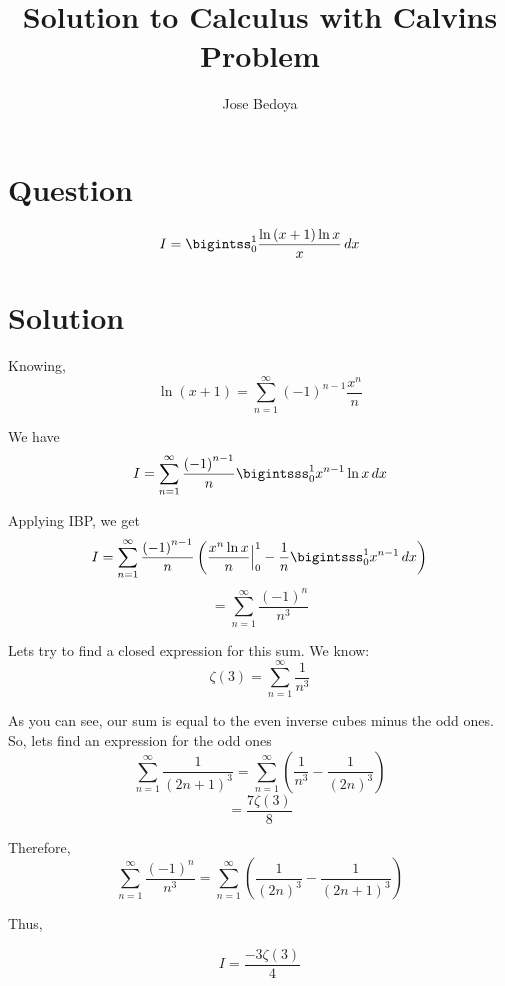\documentclass{article}
\begin{document}
\pagecolor{Red}
\title{Solution to Calculus with Calvin\textsc{}s Problem}
\author{Jose Bedoya}
\maketitle
\section{Question}
{\LARGE
$$I=\bigintss_{0}^{1} \frac{\ln \left(x+1\right)\ln x}{x}\,dx$$
}
\section{Solution}
{\Large
Knowing,
$$\ln \left(x+1\right)=\sum_{n=1}^{\infty} \left(-1\right)^{n-1}\frac{x^n}{n}$$

\vspace{3mm}
We have
$$I=\sum_{n=1}^{\infty}\frac{\left(-1\right)^{n-1}}{n}\bigintsss_{0}^{1}x^{n-1}\ln x\,dx$$

\vspace{3mm}
Applying IBP, we get
$$I=\sum_{n=1}^{\infty}\frac{\left(-1\right)^{n-1}}{n}\left(\frac{x^n\ln x}{n}\Big|_0^1-\frac{1}{n}\bigintsss_{0}^{1}x^{n-1}\,dx\right)$$
$$=\sum_{n=1}^{\infty}\frac{\left(-1\right)^n}{n^3}$$

\vspace{4mm}
Let\textsc{}s try to find a closed expression for this sum. We know:
$$\zeta\left(3\right)=\sum_{n=1}^{\infty}\frac{1}{n^3}$$

\vspace{3mm}
As you can see, our sum is equal to the even inverse cubes minus the odd ones. So, let\textsc{}s find an expression for the odd ones
$$\sum_{n=1}^{\infty}\frac{1}{\left(2n+1\right)^3}=\sum_{n=1}^{\infty}\left(\frac{1}{n^3}-\frac{1}{\left(2n\right)^3}\right)$$
$$=\frac{7\zeta\left(3\right)}{8}$$

\vspace{3mm}
Therefore,
$$\sum_{n=1}^{\infty}\frac{\left(-1\right)^n}{n^3}=\sum_{n=1}^{\infty}\left(\frac{1}{\left(2n\right)^3}-\frac{1}{\left(2n+1\right)^3}\right)$$

\vspace{5mm}
Thus,
}
{\LARGE
$$I=\frac{-3\zeta\left(3\right)}{4}$$
}
\end{document}

